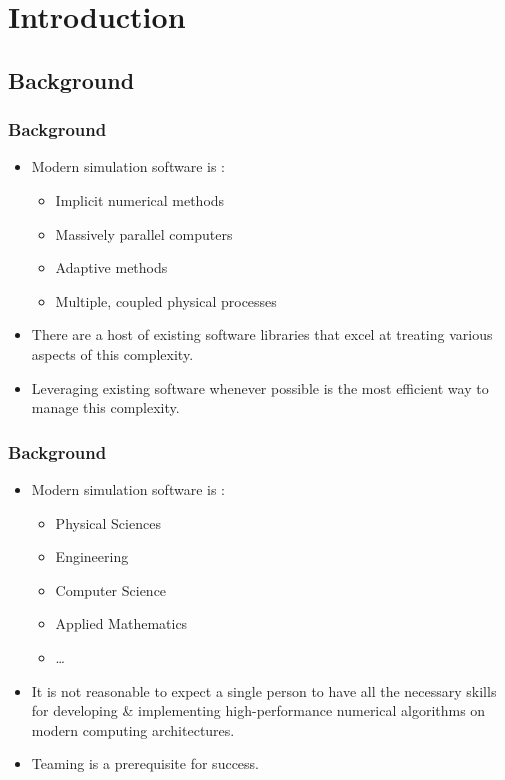 




\section{Introduction}



\subsection{Background}
\frame
{
  \frametitle{Background}                 

  \begin{itemize}
  \item Modern simulation software is :
    \begin{itemize}
    \item Implicit numerical methods
    \item Massively parallel computers
    \item Adaptive methods
    \item Multiple, coupled physical processes
    \end{itemize}
  \item There are a host of existing software libraries that excel at treating various aspects of this complexity.
  \item Leveraging existing software whenever possible is the most efficient way to manage this complexity.

  \end{itemize}
}


 

\frame
{
  \frametitle{Background}                 

  \begin{itemize}
  \item Modern simulation software is :
    \begin{itemize}
    \item Physical Sciences
    \item Engineering
    \item Computer Science
    \item Applied Mathematics
    \item \ldots
    \end{itemize}
  \item It is not reasonable to expect a single person to have all the necessary skills for developing \& implementing high-performance numerical algorithms on modern computing architectures.
  \item Teaming is a prerequisite for success.
  \end{itemize}
}


